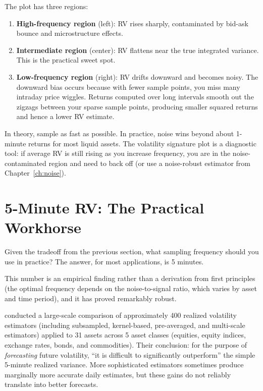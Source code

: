 The plot has three regions:
\begin{enumerate}[nosep]
  \item \textbf{High-frequency region} (left): RV rises sharply, contaminated by bid-ask bounce and microstructure effects.
  \item \textbf{Intermediate region} (center): RV flattens near the true integrated variance. This is the practical sweet spot.
  \item \textbf{Low-frequency region} (right): RV drifts downward and becomes noisy. The downward bias occurs because with fewer sample points, you miss many intraday price wiggles. Returns computed over long intervals smooth out the zigzags between your sparse sample points, producing smaller squared returns and hence a lower RV estimate.
\end{enumerate}

\begin{keyidea}
In theory, sample as fast as possible.
In practice, noise wins beyond about 1-minute returns for most liquid assets.
The volatility signature plot is a diagnostic tool: if average RV is still rising as you increase frequency, you are in the noise-contaminated region and need to back off (or use a noise-robust estimator from Chapter~\ref{ch:noise}).
\end{keyidea}

\section{5-Minute RV: The Practical Workhorse}
\label{sec:five-minute-rv}

Given the tradeoff from the previous section, what sampling frequency should you use in practice?
The answer, for most applications, is 5 minutes.

This number is an empirical finding rather than a derivation from first principles (the optimal frequency depends on the noise-to-signal ratio, which varies by asset and time period), and it has proved remarkably robust.

\begin{keyresult}
\citet{LPS2015} conducted a large-scale comparison of approximately 400 realized volatility estimators (including subsampled, kernel-based, pre-averaged, and multi-scale estimators) applied to 31 assets across 5 asset classes (equities, equity indices, exchange rates, bonds, and commodities).
Their conclusion: for the purpose of \emph{forecasting} future volatility, ``it is difficult to significantly outperform'' the simple 5-minute realized variance.
More sophisticated estimators sometimes produce marginally more accurate daily estimates, but these gains do not reliably translate into better forecasts.
\end{keyresult}

